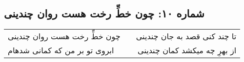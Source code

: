 \begin{center}
\section*{شماره ۱۰: چون خطِّ رخت هست روان چندینی}
\label{sec:010}
\begin{longtable}{l p{0.5cm} r}
چون خطِّ رخت هست روان چندینی
&&
تا چند کنی قصد به جان چندینی
\\
ابروی تو بر من که کمانی شدهام
&&
از بهرِ چه میکشد کمان چندینی
\\
\end{longtable}
\end{center}
